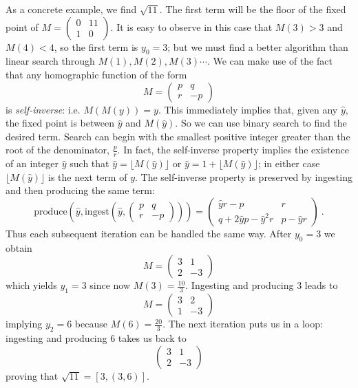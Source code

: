 \documentclass[11pt, oneside]{amsart}   	%
\begin{document}
As a concrete example, we find $\sqrt{11}$. The first term will be the floor of the fixed point of 
$M = \left(\begin{smallmatrix}
0 & 11 \\
1 & 0
\end{smallmatrix}\right)$. It is easy to observe in this case that $M(3)>3$ and
$M(4)<4$, so the first term is $y_0=3$; but we must find a better algorithm than linear search through
$M(1), M(2), M(3)\cdots$. We can make use of the fact that any homographic function of the form
 \[
 M = \begin{pmatrix}
p & q \\
r & -p
\end{pmatrix}
\]
 is \emph{self-inverse}: i.e. $M(M(y)) = y$. This immediately implies that,
given any $\hat{y}$, the fixed point is between $\hat{y}$ and $M(\hat{y})$.
So we can use binary search to find the desired term.
Search can begin with the smallest positive integer greater than the root of the denominator, $\frac{p}{r}$.
In fact, the self-inverse property implies the existence of an integer $\hat{y}$ such that $\hat{y} = \lfloor M(\hat{y}) \rfloor$ or $\hat{y} = 1 + \lfloor M(\hat{y}) \rfloor$; in either case $\lfloor M(\hat{y}) \rfloor$ is the next term of $y$. 
The self-inverse property is preserved by ingesting and then producing the same term:
\[
\mbox{produce}\left(\hat{y}, \mbox{ingest}\left(\hat{y},   \left(\begin{smallmatrix}
p & q \\
r & -p
\end{smallmatrix}\right)\right)     \right) = 
\left(\begin{smallmatrix}
 \hat{y}r-p              & r  \\
q+2\hat{y}p-\hat{y}^2r & p-\hat{y}r
\end{smallmatrix}\right)\ .
\]
Thus each subsequent iteration can be handled the same way. After $y_0=3$ we obtain
\[
M= \begin{pmatrix}
3 & 1 \\
2 & -3
\end{pmatrix}
\]
which yields $y_1=3$ since now $M(3)=\frac{10}{3}$. Ingesting and producing 3 leads to
\[
M= \begin{pmatrix}
3 & 2 \\
1 & -3
\end{pmatrix}
\]
implying $y_2=6$ because $M(6)=\frac{20}{3}$. The next iteration puts us in a loop: ingesting
and producing 6 takes us back to 
\[
 \begin{pmatrix}
3 & 1 \\
2 & -3
\end{pmatrix}
\]
proving that $\sqrt{11} = [3, (3,6)]$.
\end{document}
